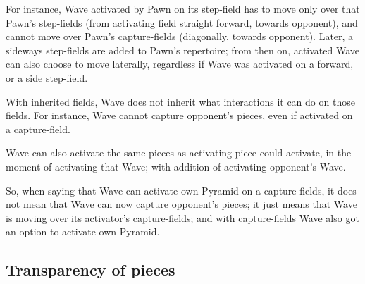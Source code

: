 For instance, Wave activated by Pawn on its step-field has to move only over that
Pawn's step-fields (from activating field straight forward, towards opponent), and
cannot move over Pawn's capture-fields (diagonally, towards opponent). Later, a
sideways step-fields are added to Pawn's repertoire; from then on, activated Wave
can also choose to move laterally, regardless if Wave was activated on a forward,
or a side step-field.

With inherited fields, Wave does not inherit what interactions it can do on those
fields. For instance, Wave cannot capture opponent's pieces, even if activated on
a capture-field.

Wave can also activate the same pieces as activating piece could activate, in the
moment of activating that Wave; with addition of activating opponent's Wave.

So, when saying that Wave can activate own Pyramid on a capture-fields, it does
not mean that Wave can now capture opponent's pieces; it just means that Wave is
moving over its activator's capture-fields; and with capture-fields Wave also got
an option to activate own Pyramid.

\clearpage %

\subsection*{Transparency of pieces}
\label{sec:Appendix/Summary/Transparency of pieces}

